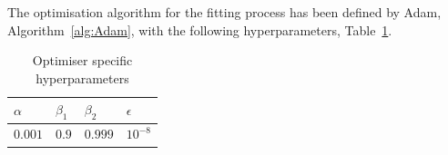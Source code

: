 %
%
The optimisation algorithm for the fitting process has been defined by Adam, Algorithm~\ref{alg:Adam}, with the following hyperparameters, Table~\ref{tab:newM-params}. \\
\begin{table}[htbp]
    \centering
    \caption{Optimiser specific hyperparameters}
    \label{tab:newM-params}
    \begin{tabular}{ p{1.5cm} p{1.5cm} p{1.5cm} p{1.5cm}  }
        \hline
        $\alpha$ & $\beta_1 $ & $\beta_2$ & $\epsilon$ \\
        \hline
        $0.001$ & $0.9$ & $0.999$ & $10^{-8}$ \\%
        \hline
    \end{tabular}
\end{table}